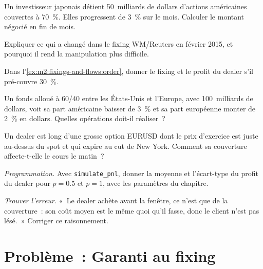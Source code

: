 \begin{exercise}[$\star$]\label{exo:m2:fixings-and-flows:2}
Un investisseur japonais détient 50~milliards de dollars d'actions américaines couvertes à 70~\%. Elles
progressent de 3~\% sur le mois. Calculer le montant négocié en fin de mois.
\end{exercise}

\begin{exercise}[$\star$]\label{exo:m2:fixings-and-flows:3}
Expliquer ce qui a changé dans le fixing WM/Reuters en février 2015, et pourquoi il rend
la manipulation plus difficile.
\end{exercise}

\begin{exercise}[$\star\star$]\label{exo:m2:fixings-and-flows:4}
Dans l'\cref{ex:m2:fixings-and-flows:order}, donner le fixing et le profit du dealer s'il
pré-couvre 30~\%.
\end{exercise}

\begin{exercise}[$\star\star$]\label{exo:m2:fixings-and-flows:5}
Un fonds alloué à 60/40 entre les États-Unis et l'Europe, avec 100~milliards de dollars, voit sa part américaine baisser de 3~\%
et sa part européenne monter de 2~\% en dollars. Quelles opérations doit-il réaliser~?
\end{exercise}

\begin{exercise}[$\star\star$]\label{exo:m2:fixings-and-flows:6}
Un dealer est long d'une grosse option EURUSD dont le prix d'exercice est juste au-dessus du spot et qui expire
au cut de New York. Comment sa couverture affecte-t-elle le cours le matin~?
\end{exercise}

\begin{exercise}[$\star\star\star$]\label{exo:m2:fixings-and-flows:7}
\emph{Programmation.} Avec \texttt{simulate\_pnl}, donner la moyenne et l'écart-type
du profit du dealer pour $p = 0.5$ et $p = 1$, avec les paramètres du chapitre.
\end{exercise}

\begin{exercise}[$\star\star\star$]\label{exo:m2:fixings-and-flows:8}
\emph{Trouver l'erreur.} «~Le dealer achète avant la fenêtre, ce n'est que de la couverture~:
son coût moyen est le même quoi qu'il fasse, donc le client n'est pas lésé.~»
Corriger ce raisonnement.
\end{exercise}

\section{Problème~: Garanti au fixing}

